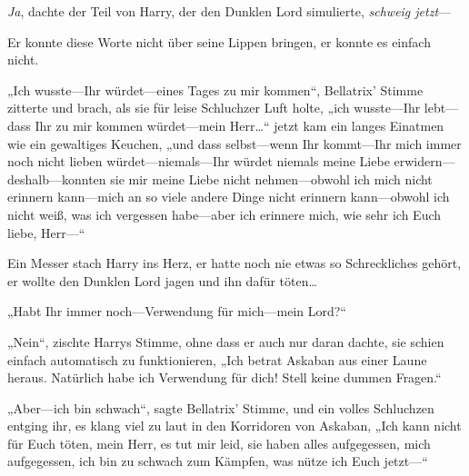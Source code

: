 \emph{Ja}, dachte der Teil von Harry, der den Dunklen Lord simulierte, \emph{schweig jetzt}—

Er konnte diese Worte nicht über seine Lippen bringen, er konnte es einfach nicht.

„Ich wusste—Ihr würdet—eines Tages zu mir kommen“, Bellatrix’ Stimme zitterte und brach, als sie für leise Schluchzer Luft holte, „ich wusste—Ihr lebt—dass Ihr zu mir kommen würdet—mein Herr…“ jetzt kam ein langes Einatmen wie ein gewaltiges Keuchen, „und dass selbst—wenn Ihr kommt—Ihr mich immer noch nicht lieben würdet—niemals—Ihr würdet niemals meine Liebe erwidern—deshalb—konnten sie mir meine Liebe nicht nehmen—obwohl ich mich nicht erinnern kann—mich an so viele andere Dinge nicht erinnern kann—obwohl ich nicht weiß, was ich vergessen habe—aber ich erinnere mich, wie sehr ich Euch liebe, Herr—“

Ein Messer stach Harry ins Herz, er hatte noch nie etwas so Schreckliches gehört, er wollte den Dunklen Lord jagen und ihn dafür töten…

„Habt Ihr immer noch—Verwendung für mich—mein Lord?“

„Nein“, zischte Harrys Stimme, ohne dass er auch nur daran dachte, sie schien einfach automatisch zu funktionieren, „Ich betrat Askaban aus einer Laune heraus. Natürlich habe ich Verwendung für dich! Stell keine dummen Fragen.“

„Aber—ich bin schwach“, sagte Bellatrix’ Stimme, und ein volles Schluchzen entging ihr, es klang viel zu laut in den Korridoren von Askaban, „Ich kann nicht für Euch töten, mein Herr, es tut mir leid, sie haben alles aufgegessen, mich aufgegessen, ich bin zu schwach zum Kämpfen, was nütze ich Euch jetzt—“

